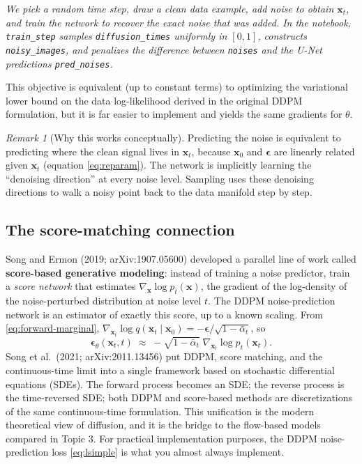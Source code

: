 \documentclass[11pt]{article}
\theoremstyle{remark}
\newtheorem*{remark}{Remark}
\begin{document}
\textit{We pick a random time step, draw a clean data example, add noise to obtain $\mathbf{x}_t$, and train the network to recover the exact noise that was added. In the notebook, \texttt{train\_step} samples \texttt{diffusion\_times} uniformly in $[0,1]$, constructs \texttt{noisy\_images}, and penalizes the difference between \texttt{noises} and the U\!-Net predictions \texttt{pred\_noises}.}

This objective is equivalent (up to constant terms) to optimizing the variational lower bound on the data log-likelihood derived in the original DDPM formulation, but it is far easier to implement and yields the same gradients for $\theta$.

\begin{remark}[Why this works conceptually]
Predicting the noise is equivalent to predicting where the clean signal lives in $\mathbf{x}_t$, because $\mathbf{x}_0$ and $\boldsymbol{\epsilon}$ are linearly related given $\mathbf{x}_t$ (equation \eqref{eq:reparam}). The network is implicitly learning the ``denoising direction'' at every noise level. Sampling uses these denoising directions to walk a noisy point back to the data manifold step by step.
\end{remark}

\subsection{The score-matching connection}

Song and Ermon (2019; arXiv:1907.05600) developed a parallel line of work called \textbf{score-based generative modeling}: instead of training a noise predictor, train a \emph{score network} that estimates $\nabla_{\mathbf{x}} \log p_t(\mathbf{x})$, the gradient of the log-density of the noise-perturbed distribution at noise level $t$. The DDPM noise-prediction network is an estimator of exactly this score, up to a known scaling. From \eqref{eq:forward-marginal}, $\nabla_{\mathbf{x}_t}\log q(\mathbf{x}_t\mid\mathbf{x}_0) = -\boldsymbol{\epsilon}/\sqrt{1-\bar{\alpha}_t}$, so
\begin{equation}
\boldsymbol{\epsilon}_\theta(\mathbf{x}_t, t) \;\approx\; -\sqrt{1 - \bar{\alpha}_t}\; \nabla_{\mathbf{x}_t} \log p_t(\mathbf{x}_t).
\label{eq:score}
\end{equation}
Song et al.\ (2021; arXiv:2011.13456) put DDPM, score matching, and the continuous-time limit into a single framework based on stochastic differential equations (SDEs). The forward process becomes an SDE; the reverse process is the time-reversed SDE; both DDPM and score-based methods are discretizations of the same continuous-time formulation. This unification is the modern theoretical view of diffusion, and it is the bridge to the flow-based models compared in Topic 3. For practical implementation purposes, the DDPM noise-prediction loss \eqref{eq:lsimple} is what you almost always implement.
\end{document}
